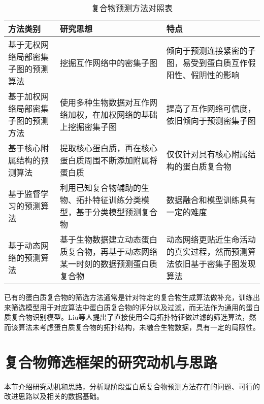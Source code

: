 \begin{table}[h]
  \centering
  \caption{复合物预测方法对照表}
  \label{tab:MethodSummary}
  \begin{tabular}{L{3cm}L{6cm}L{5cm}}
    \toprule
    \textbf{方法类别}          & \textbf{研究思想}                                                              & \textbf{特点}                                                          \\
    \midrule
    基于无权网络局部密集子图的预测算法     & 挖掘互作网络中的密集子图                                                       & 倾向于预测连接紧密的子图，易受到蛋白质互作假阳性、假阴性的影响         \\\hline
    基于加权网络局部密集子图的预测方法 & 使用多种生物数据对互作网络加权，在加权网络的基础上挖掘密集子图                 & 提高了互作网络可信度，依旧倾向于预测密集子图                           \\\hline
    基于核心附属结构的预测算法     & 提取核心蛋白质，再在核心蛋白质周围不断添加附属将蛋白质                         & 仅仅针对具有核心附属结构的蛋白质复合物                                 \\\hline
    基于监督学习的预测算法         & 利用已知复合物辅助的生物、拓扑特征训练分类模型，基于分类模型预测复合物         & 数据融合和模型训练具有一定的难度                                       \\\hline
    基于动态网络的预测算法       & 基于生物数据建立动态蛋白质复合物，再基于动态网络某一时刻的数据预测蛋白质复合物 & 动态网络更贴近生命活动的真实过程，然而预测算法依旧基于密集子图发现算法 \\
    \bottomrule
  \end{tabular}
\end{table}

已有的蛋白质复合物的筛选方法通常是针对特定的复合物生成算法做补充，训练出来筛选模型用于对应算法中蛋白质复合物的评分以及过滤，而无法作为通用的蛋白质复合物识别模型。Liu等人\cite{liu_identifying_2018}提出了直接使用全局拓扑特征做过滤的筛选算法，然而该算法未考虑蛋白质复合物的拓扑结构，未融合生物数据，具有一定的局限性。

\section{复合物筛选框架的研究动机与思路}
\label{section:intro:motivationAndThinking}

本节介绍研究动机和思路，分析现阶段蛋白质复合物预测方法存在的问题、可行的改进思路以及相关的数据基础。

